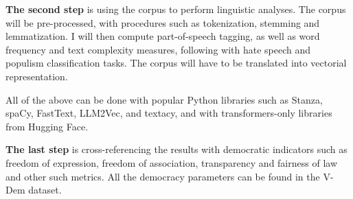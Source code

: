 \documentclass[12pt,a4paper,sans]{moderncv} %
\begin{document}
\vspace{2mm}

\textbf{The second step} is using the corpus to perform linguistic analyses. The corpus will be pre-processed, with procedures such as tokenization, stemming and lemmatization. I will then compute part-of-speech tagging, as well as word frequency and text complexity measures, following with hate speech and populism classification tasks. The corpus will have to be translated into vectorial representation.

All of the above can be done with popular Python libraries such as Stanza, spaCy, FastText, LLM2Vec, and textacy, and with transformers-only libraries from Hugging Face. 

\vspace{2mm}

\textbf{The last step} is cross-referencing the results with democratic indicators such as freedom of expression, freedom of association, transparency and fairness of law and other such metrics. All the democracy parameters can be found in the V-Dem dataset.









\end{document}
